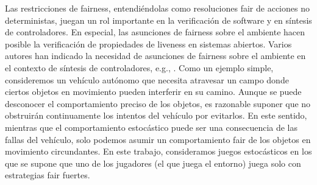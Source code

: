 Las restricciones de fairness, entendiéndolas como resoluciones fair de acciones no deterministas, juegan un rol importante en la verificación de software y en síntesis de controladores.
En especial, las asunciones de fairness sobre el ambiente hacen posible la verificación de propiedades de liveness en sistemas abiertos. 
Varios autores han indicado la necesidad de asunciones de fairness sobre el ambiente en el contexto de síntesis de controladores, e.g., \cite{DBLP:conf/fossacs/AsarinCV10,DBLP:conf/icse/DIppolitoBPU11}.
Como un ejemplo simple, consideremos un vehículo autónomo que necesita atravesar un campo donde ciertos objetos en movimiento pueden interferir en su camino. Aunque se puede desconocer el comportamiento preciso de los objetos, es razonable suponer que no obstruirán continuamente los intentos del vehículo por evitarlos. En este sentido, mientras que el comportamiento estocástico puede ser una consecuencia de las fallas del vehículo, solo podemos asumir un comportamiento fair de los objetos en movimiento circundantes.
En este trabajo, consideramos juegos estocásticos en los que se supone que uno de los jugadores (el que juega el entorno) juega solo con estrategias fair fuertes.

